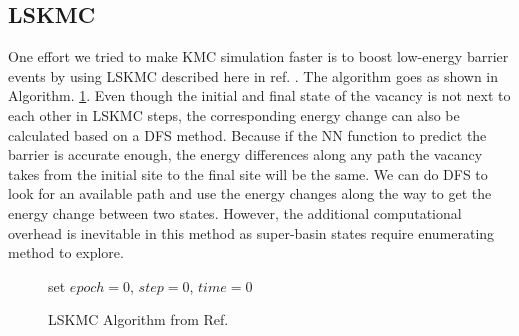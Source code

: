 \subsection{\acf{LSKMC}}
One effort we tried to make \ac{KMC} simulation faster is to boost low-energy barrier events by using \acf{LSKMC} described here in ref. \cite{fichthorn2013local}. The algorithm goes as shown in Algorithm. \ref{algo:lskmc}. Even though the initial and final state of the vacancy is not next to each other in \ac{LSKMC} steps, the corresponding energy change can also be calculated based on a \ac{DFS} method. Because if the \ac{NN} function to predict the barrier is accurate enough, the energy differences along any path the vacancy takes from the initial site to the final site will be the same. We can do \ac{DFS} to look for an available path and use the energy changes along the way to get the energy change between two states. However, the additional computational overhead is inevitable in this method as super-basin states require enumerating method to explore. 

\begin{figure}[!htb]
  \centering
  \begin{minipage}{.75\linewidth}
    \begin{algorithm}[H]
      \caption{\acf{LSKMC} Algorithm from  Ref. \cite{fichthorn2013local}}\label{algo:lskmc}
      \begin{algorithmic}[1]
        \State set $epoch = 0$, $step = 0$, $time = 0$
        \Else 
        \EndIf
        \EndIf
        
        \EndWhile
      \end{algorithmic}
    \end{algorithm}
  \end{minipage}
\end{figure}

